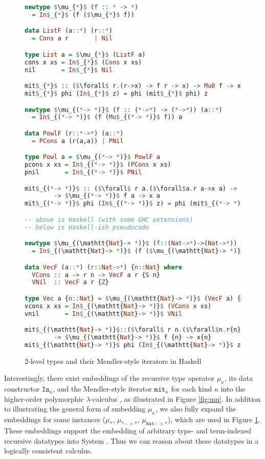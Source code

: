\begin{figure}\vspace*{-8pt}
\begin{singlespace}
\begin{lstlisting}[basicstyle={\ttfamily\small},language=Haskell,mathescape]
newtype $\mu_{*}$ (f :: * -> *)
  = In$_{*}$ (f ($\mu_{*}$ f))

data ListF (a::*) (r::*)
  = Cons a r       | Nil

type List a = $\mu_{*}$ (ListF a)
cons x xs = In$_{*}$ (Cons x xs)
nil       = In$_{*}$ Nil

mit$_{*}$ :: ($\forall$ r.(r->x) -> f r -> x) -> Mu0 f -> x
mit$_{*}$ phi (In$_{*}$ z) = phi (mit$_{*}$ phi) z

newtype $\mu_{(*-> *)}$ (f :: (*->*) -> (*->*)) (a::*)
  = In$_{(*-> *)}$ (f (Mu$_{(*-> *)}$ f)) a

data PowlF (r::*->*) (a::*)
  = PCons a (r(a,a)) | PNil

type Powl a = $\mu_{(*-> *)}$ PowlF a
pcons x xs = In$_{(*-> *)}$ (PCons x xs)
pnil       = In$_{(*-> *)}$ PNil

mit$_{(*-> *)}$ :: ($\forall$ r a.($\forall$a.r a->x a) -> f r a -> x a)
        -> $\mu_{(*-> *)}$ f a -> x a
mit$_{(*-> *)}$ phi (In$_{(*-> *)}$ z) = phi (mit$_{(*-> *)}$ phi) z

-- above is Haskell (with some GHC extensions)
-- below is Haskell-ish pseudocode

newtype $\mu_{(\mathtt{Nat}-> *)}$ (f::(Nat->*)->(Nat->*)) {n::Nat}
  = In$_{(\mathtt{Nat}-> *)}$ (f ($\mu_{(\mathtt{Nat}-> *)}$ f)) {n}

data VecF (a::*) (r::Nat->*) {n::Nat} where
  VCons :: a -> r n -> VecF a r {S n}
  VNil  :: VecF a r {Z}

type Vec a {n::Nat} = $\mu_{(\mathtt{Nat}-> *)}$ (VecF a) {n}
vcons x xs = In$_{(\mathtt{Nat}-> *)}$ (VCons x xs)
vnil       = In$_{(\mathtt{Nat}-> *)}$ VNil

mit$_{(\mathtt{Nat}-> *)}$::($\forall$ r n.($\forall$n.r{n}->x{n})->f r {n}->x{n})
        -> $\mu_{(\mathtt{Nat}-> *)}$ f {n} -> x{n}
mit$_{(\mathtt{Nat}-> *)}$ phi (In$_{(\mathtt{Nat}-> *)}$ z) = phi (mit$_{(\mathtt{Nat}-> *)}$ phi) z
\end{lstlisting}
\end{singlespace}
\caption{2-level types and their Mendler-style iterators in Haskell}
\label{fig:twoleveltypes}
\end{figure}

Interestingly, there exist embeddings of the recursive type operator
$\mu_\kappa$, its data constructor $\mathtt{In}_\kappa$, and
the Mendler-style iterator $\mathtt{mit}_\kappa$ for each kind $\kappa$
into the higher-order polymorphic $\lambda$-calculus \Fi, as illustrated
in Figure \ref{fig:mu}. In addition to illustrating the general form of
embedding $\mu_\kappa$, we also fully expand the embeddings for some
instances ($\mu_{*}$, $\mu_{*->*}$, $\mu_{\mathtt{Nat}->*}$), which are
used in Figure \ref{fig:twoleveltypes}. These embeddings support the embedding
of arbitrary type- and term-indexed recursive datatypes into System \Fi.
Thus we can reason about these datatypes in a logically consistent calculus.

